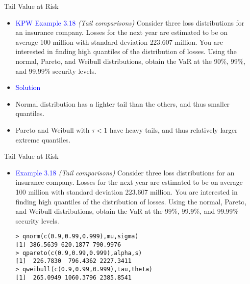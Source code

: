 \documentclass{beamer}
\begin{document}
\begin{frame}{Tail Value at Risk}
\begin{itemize}
\item \textcolor{blue}{KPW Example 3.18} \textit{(Tail comparisons)} Consider three loss distributions for an insurance company. Losses
for the next year are estimated to be on average 100 million with standard deviation 223.607
million. You are interested in finding high quantiles of the distribution of losses. Using
the normal, Pareto, and Weibull distributions, obtain the VaR at the 90\%, 99\%, and
99.99\% security levels.
\vspace{0.3cm}
\item \textcolor{blue}{Solution}
\vspace{0.3cm}
\item[] Normal distribution has a lighter tail than the others, and thus smaller quantiles.
\vspace{0.3cm}
\item[] Pareto and Weibull with $\tau<1$ have heavy tails, and thus relatively larger extreme quantiles.
\end{itemize}
\end{frame}

\begin{frame}[fragile]{Tail Value at Risk}
\begin{itemize}
\item \textcolor{blue}{Example 3.18} \textit{(Tail comparisons)} Consider three loss distributions for an insurance company. Losses
for the next year are estimated to be on average 100 million with standard deviation 223.607
million. You are interested in finding high quantiles of the distribution of losses. Using
the normal, Pareto, and Weibull distributions, obtain the VaR at the 99\%, 99.9\%, and
99.99\% security levels.
\vspace{0.3cm}
\begin{verbatim}
> qnorm(c(0.9,0.99,0.999),mu,sigma)
[1] 386.5639 620.1877 790.9976
> qpareto(c(0.9,0.99,0.999),alpha,s)
[1]  226.7830  796.4362 2227.3411
> qweibull(c(0.9,0.99,0.999),tau,theta)
[1]  265.0949 1060.3796 2385.8541
\end{verbatim}
\end{itemize}
\end{frame}
\end{document}
